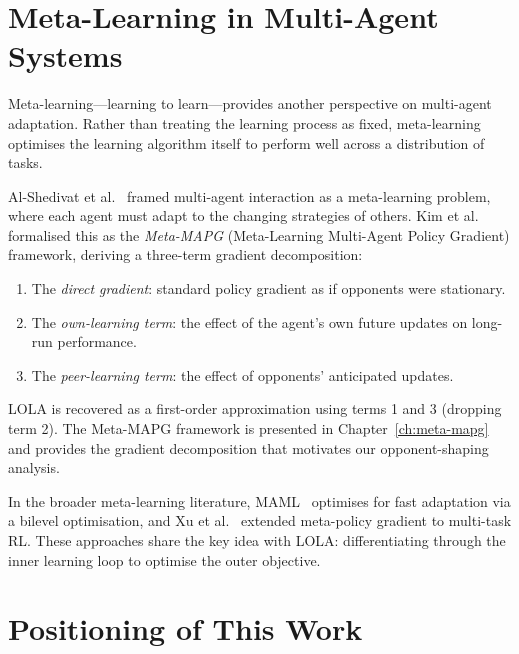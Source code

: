 \section{Meta-Learning in Multi-Agent Systems}
\label{sec:lit-meta}

Meta-learning---learning to learn---provides another perspective on multi-agent adaptation. Rather than treating the learning process as fixed, meta-learning optimises the learning algorithm itself to perform well across a distribution of tasks.

Al-Shedivat et al.~\cite{alshedivat2018} framed multi-agent interaction as a meta-learning problem, where each agent must adapt to the changing strategies of others. Kim et al.~\cite{kim2021policy} formalised this as the \emph{Meta-MAPG} (Meta-Learning Multi-Agent Policy Gradient) framework, deriving a three-term gradient decomposition:
\begin{enumerate}
    \item The \emph{direct gradient}: standard policy gradient as if opponents were stationary.
    \item The \emph{own-learning term}: the effect of the agent's own future updates on long-run performance.
    \item The \emph{peer-learning term}: the effect of opponents' anticipated updates.
\end{enumerate}
LOLA is recovered as a first-order approximation using terms 1 and 3 (dropping term 2). The Meta-MAPG framework is presented in Chapter~\ref{ch:meta-mapg} and provides the gradient decomposition that motivates our opponent-shaping analysis.

In the broader meta-learning literature, MAML~\cite{finn2017} optimises for fast adaptation via a bilevel optimisation, and Xu et al.~\cite{xu2018meta} extended meta-policy gradient to multi-task RL. These approaches share the key idea with LOLA: differentiating through the inner learning loop to optimise the outer objective.


\section{Positioning of This Work}
\label{sec:lit-positioning}

